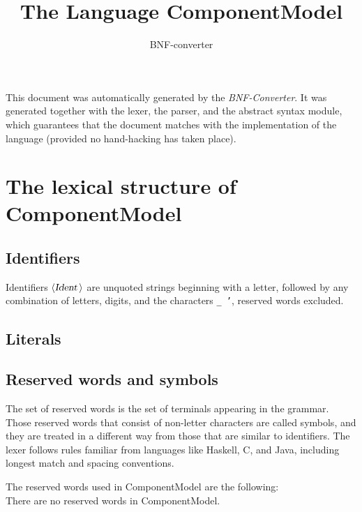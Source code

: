 \documentclass[a4paper,11pt]{article}
\author{BNF-converter}
\title{The Language ComponentModel}
\begin{document}
\maketitle

\newcommand{\emptyP}{\mbox{$\epsilon$}}
\newcommand{\terminal}[1]{\mbox{{\texttt {#1}}}}
\newcommand{\nonterminal}[1]{\mbox{$\langle \mbox{{\sl #1 }} \! \rangle$}}
\newcommand{\arrow}{\mbox{::=}}
\newcommand{\delimit}{\mbox{$|$}}
\newcommand{\reserved}[1]{\mbox{{\texttt {#1}}}}
\newcommand{\literal}[1]{\mbox{{\texttt {#1}}}}
\newcommand{\symb}[1]{\mbox{{\texttt {#1}}}}

This document was automatically generated by the {\em BNF-Converter}. It was generated together with the lexer, the parser, and the abstract syntax module, which guarantees that the document matches with the implementation of the language (provided no hand-hacking has taken place).

\section*{The lexical structure of ComponentModel}
\subsection*{Identifiers}
Identifiers \nonterminal{Ident} are unquoted strings beginning with a letter,
followed by any combination of letters, digits, and the characters {\tt \_ '},
reserved words excluded.


\subsection*{Literals}


\subsection*{Reserved words and symbols}
The set of reserved words is the set of terminals appearing in the grammar. Those reserved words that consist of non-letter characters are called symbols, and they are treated in a different way from those that are similar to identifiers. The lexer follows rules familiar from languages like Haskell, C, and Java, including longest match and spacing conventions.

The reserved words used in ComponentModel are the following: \\

There are no reserved words in ComponentModel.\\
\end{document}
